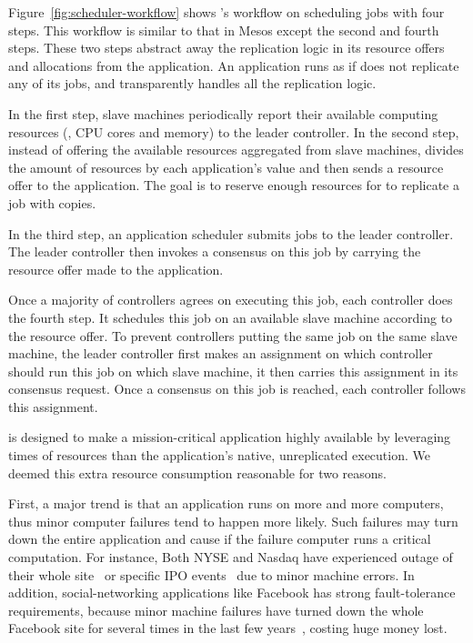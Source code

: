 Figure~\ref{fig:scheduler-workflow} shows \tripod's workflow on scheduling jobs 
with four steps. This workflow is similar to that in Mesos except the second 
and fourth steps. These two steps \tripod abstract away the replication logic 
in its resource offers and allocations from the application. An application runs 
as if \xxx does not replicate any of its jobs, and \tripod transparently 
handles all the replication logic.

In the first step, slave machines periodically report their available computing 
resources (\eg, CPU cores and memory) to the leader controller. In the second 
step, instead of offering the available resources aggregated from slave 
machines, \tripod divides the amount of resources by each application's  
value and then sends a resource offer to the application. The goal is to 
reserve enough resources for \tripod to replicate a job with  copies.

In the third step, an application scheduler submits jobs to the leader 
controller. The leader controller then invokes a consensus on this job by 
carrying the resource offer made to the application.

Once a majority of controllers agrees on executing this job, each controller 
does the fourth step. It schedules this job on an available slave machine 
according to the resource offer. To prevent controllers putting the same job on 
the same slave machine, the leader controller first makes an assignment on 
which controller should run this job on which slave machine, it then carries 
this assignment in its consensus request. Once a consensus on this job is 
reached, each controller follows this assignment.



 \tripod is designed to make a
mission-critical application highly available by leveraging  times of 
resources than the application's native, unreplicated execution. We deemed this 
extra resource consumption reasonable for two reasons.

First, a major trend is that an application runs on more and more 
computers, thus minor computer failures tend to happen more likely. Such 
failures may turn down the entire application and cause if the failure computer 
runs a critical computation. For instance, Both NYSE and Nasdaq have experienced 
outage of their whole site~\cite{nyse:halt} or specific IPO 
events~\cite{facebook:ipo:delay} due to minor machine errors. 
In addition, social-networking applications like Facebook has 
strong fault-tolerance requirements, because minor machine failures have turned 
down the whole Facebook site for several times in the last few 
years~\cite{facebook:outage}, costing huge money lost. 

